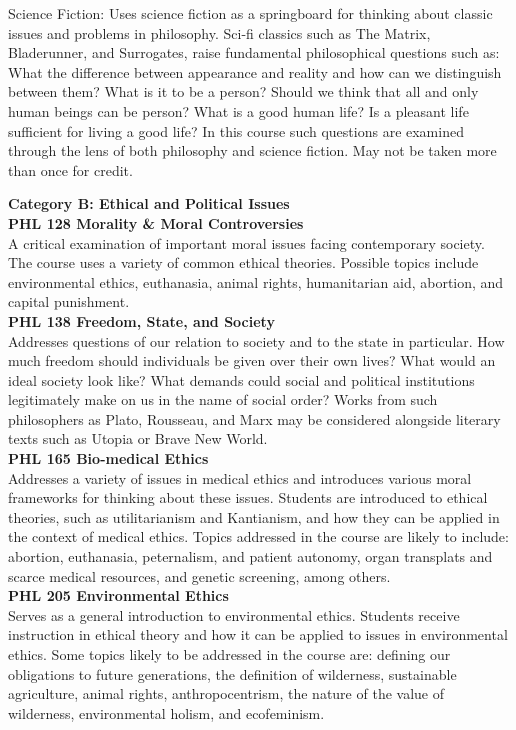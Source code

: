 \documentclass[
  letterpaper,
]{scrbook}
\begin{document}
Science Fiction: Uses science fiction as a springboard for thinking
about classic issues and problems in philosophy. Sci-fi classics such as
The Matrix, Bladerunner, and Surrogates, raise fundamental philosophical
questions such as: What the difference between appearance and reality
and how can we distinguish between them? What is it to be a person?
Should we think that all and only human beings can be person? What is a
good human life? Is a pleasant life sufficient for living a good life?
In this course such questions are examined through the lens of both
philosophy and science fiction. May not be taken more than once for
credit.

\textbf{Category B: Ethical and Political Issues}\\
\textbf{PHL 128 Morality \& Moral Controversies}\\
A critical examination of important moral issues facing contemporary
society. The course uses a variety of common ethical theories. Possible
topics include environmental ethics, euthanasia, animal rights,
humanitarian aid, abortion, and capital punishment.\\
\textbf{PHL 138 Freedom, State, and Society}\\
Addresses questions of our relation to society and to the state in
particular. How much freedom should individuals be given over their own
lives? What would an ideal society look like? What demands could social
and political institutions legitimately make on us in the name of social
order? Works from such philosophers as Plato, Rousseau, and Marx may be
considered alongside literary texts such as Utopia or Brave New World.\\
\textbf{PHL 165 Bio-medical Ethics}\\
Addresses a variety of issues in medical ethics and introduces various
moral frameworks for thinking about these issues. Students are
introduced to ethical theories, such as utilitarianism and Kantianism,
and how they can be applied in the context of medical ethics. Topics
addressed in the course are likely to include: abortion, euthanasia,
peternalism, and patient autonomy, organ transplats and scarce medical
resources, and genetic screening, among others.\\
\textbf{PHL 205 Environmental Ethics}\\
Serves as a general introduction to environmental ethics. Students
receive instruction in ethical theory and how it can be applied to
issues in environmental ethics. Some topics likely to be addressed in
the course are: defining our obligations to future generations, the
definition of wilderness, sustainable agriculture, animal rights,
anthropocentrism, the nature of the value of wilderness, environmental
holism, and ecofeminism.
\end{document}
